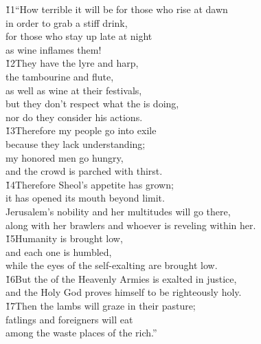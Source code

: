 \begin{poetry}
\poeml \v{11}``How terrible it will be for those who rise at dawn \\
\poemll    in order to grab a stiff drink, \\
\poeml for those who stay up late at night \\
\poemll    as wine inflames them! \\
\poeml \v{12}They have the lyre and harp, \\
\poemll    the tambourine and flute, \\
\poemlll       as well as wine at their festivals, \\
\poeml but they don't respect what the  is doing, \\
\poemll    nor do they consider his actions. \\
\poeml \v{13}Therefore my people go into exile \\
\poemll    because they lack understanding; \\
\poeml my honored men go hungry, \\
\poemll    and the crowd is parched with thirst. \\
\poeml \v{14}Therefore Sheol's appetite has grown; \\
\poemll    it has opened its mouth beyond limit. \\
\poeml Jerusalem's nobility and her multitudes will go there, \\
\poemll    along with her brawlers and whoever is reveling within her. \\
\poeml \v{15}Humanity is brought low, \\
\poemll    and each one is humbled, \\
\poemlll       while the eyes of the self-exalting are brought low. \\
\poeml \v{16}But the  of the Heavenly Armies is exalted in justice, \\
\poemll    and the Holy God proves himself to be righteously holy. \\
\poeml \v{17}Then the lambs will graze in their pasture; \\
\poemll    fatlings and foreigners will eat \\
\poemlll       among the waste places of the rich.''

\end{poetry}
